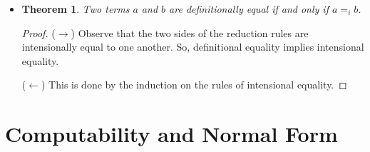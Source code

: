 \documentclass[10pt]{article}
\newtheorem{theorem}[lemma]{Theorem}
\begin{document}
\begin{itemize}
      \item \begin{theorem} Two terms $a$ and $b$ are definitionally equal if and only if $a =_i b$. \end{theorem}
      \begin{proof}
        ($\rightarrow$) Observe that the two sides of the reduction rules are intensionally equal to one another.
        So, definitional equality implies intensional equality.
        
        ($\leftarrow$) This is done by the induction on the rules of intensional equality.
      \end{proof}
    \end{itemize}
    
  \section{Computability and Normal Form}
  
\end{document}
